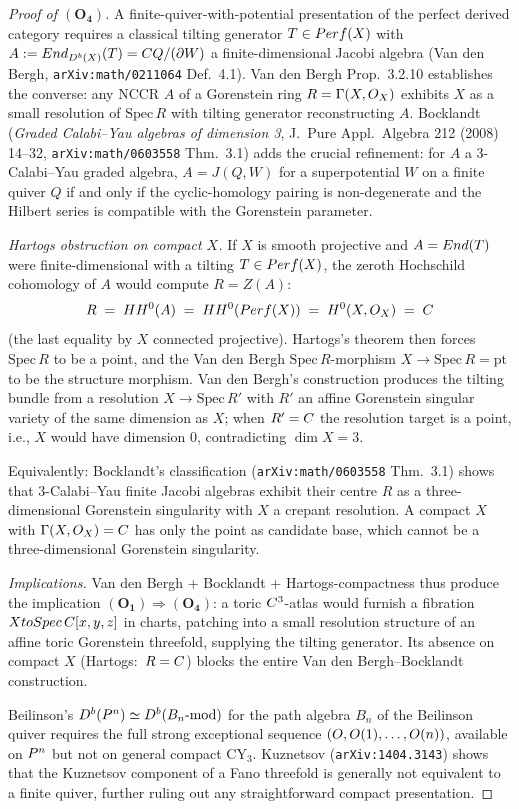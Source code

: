 \begin{proof}[Proof of $(\mathbf{O_4})$]
A finite-quiver-with-potential presentation of the perfect derived
category requires a classical tilting generator $T \in Perf(X)$ with
$A := End_{D^b(X)}(T) = C Q / (\partial W)$ a finite-dimensional
Jacobi algebra (Van den Bergh, \texttt{arXiv:math/0211064} Def.~4.1).
Van den Bergh Prop.~3.2.10 establishes the converse: any NCCR $A$ of a
Gorenstein ring $R = \Gamma(X, O_X)$ exhibits $X$ as a small
resolution of $\mathrm{Spec}\,R$ with tilting generator reconstructing
$A$. Bocklandt (\emph{Graded Calabi--Yau algebras of dimension 3},
J.\ Pure Appl.\ Algebra 212 (2008) 14--32,
\texttt{arXiv:math/0603558} Thm.~3.1) adds the crucial refinement: for
$A$ a $3$-Calabi--Yau graded algebra, $A = J(Q, W)$ for a superpotential
$W$ on a finite quiver $Q$ if and only if the cyclic-homology pairing
is non-degenerate and the Hilbert series is compatible with the
Gorenstein parameter.

\emph{Hartogs obstruction on compact $X$.}
If $X$ is smooth projective and $A = End(T)$ were finite-dimensional
with a tilting $T \in Perf(X)$, the zeroth Hochschild cohomology of
$A$ would compute $R = Z(A)$:
\[
  R \;=\; HH^0(A) \;=\; HH^0(Perf(X)) \;=\; H^0(X, O_X) \;=\; C
\]
(the last equality by $X$ connected projective). Hartogs's theorem then
forces $\mathrm{Spec}\,R$ to be a point, and the Van den Bergh
$\mathrm{Spec}\,R$-morphism $X \to \mathrm{Spec}\,R = \mathrm{pt}$ to
be the structure morphism. Van den Bergh's construction produces the
tilting bundle from a resolution $X \to \mathrm{Spec}\,R'$ with $R'$
an affine Gorenstein singular variety of the same dimension as $X$;
when $R' = C$ the resolution target is a point, i.e., $X$ would have
dimension $0$, contradicting $\dim X = 3$.

Equivalently: Bocklandt's classification (\texttt{arXiv:math/0603558}
Thm.~3.1) shows that $3$-Calabi--Yau finite Jacobi algebras exhibit
their centre $R$ as a three-dimensional Gorenstein singularity with $X$
a crepant resolution. A compact $X$ with $\Gamma(X, O_X) = C$ has
only the point as candidate base, which cannot be a three-dimensional
Gorenstein singularity.

\emph{Implications.}
Van den Bergh + Bocklandt + Hartogs-compactness thus produce the
implication $(\mathbf{O_1}) \Rightarrow (\mathbf{O_4})$: a toric
$C^3$-atlas would furnish a fibration $X to Spec\,C[x,y,z]$
in charts, patching into a small resolution structure of an affine
toric Gorenstein threefold, supplying the tilting generator. Its
absence on compact $X$ (Hartogs:\ $R = C$) blocks the entire
Van den Bergh--Bocklandt construction.

Beilinson's $D^b(P^n) \simeq D^b(B_n\text{-mod})$ for the path algebra
$B_n$ of the Beilinson quiver requires the full strong exceptional
sequence $(O, O(1), \dots, O(n))$, available on $P^n$ but not
on general compact CY$_3$. Kuznetsov (\texttt{arXiv:1404.3143}) shows
that the Kuznetsov component of a Fano threefold is generally not
equivalent to a finite quiver, further ruling out any straightforward
compact presentation.
\end{proof}

